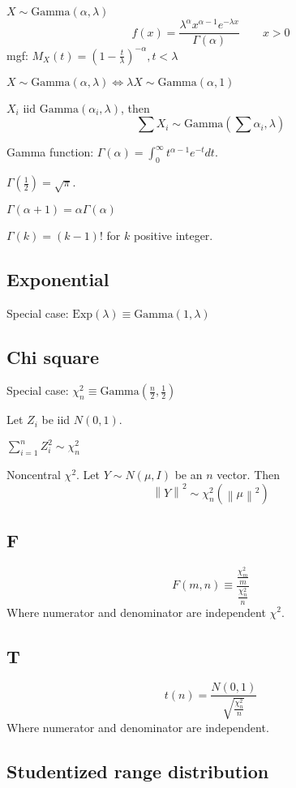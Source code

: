 \documentclass[10pt, twocolumn]{article}
\newcommand{\norm}[1]{\left\lVert#1\right\rVert}
\newcommand{\iid}{\text{ iid }}
\begin{document}
$X \sim \text{Gamma}(\alpha, \lambda)$
\[
    f(x) = \frac{\lambda^\alpha x^{\alpha-1} e^{-\lambda x}}{\Gamma(\alpha)}
    \qquad x > 0
\]
mgf: $M_X (t) = (1 - \frac{t}{\lambda})^{-\alpha}, t < \lambda$

$X \sim \text{Gamma}(\alpha, \lambda) \iff \lambda X \sim \text{Gamma}(\alpha, 1)$

$X_i \iid \text{Gamma}(\alpha_i, \lambda)$, then
\[
    \sum X_i \sim \text{Gamma}(\sum \alpha_i, \lambda)
\]

Gamma function: $\Gamma(\alpha) = \int_0^\infty t^{\alpha-1} e^{-t} dt$.

$\Gamma(\frac{1}{2}) = \sqrt{\pi}$.

$\Gamma(\alpha + 1) = \alpha \Gamma(\alpha)$

$\Gamma(k) = (k-1)!$ for $k$ positive integer.

\subsection{Exponential}

Special case: $\text{Exp}(\lambda) \equiv \text{Gamma}(1, \lambda)$

\subsection{Chi square}

Special case: $\chi^2_n \equiv \text{Gamma}(\frac{n}{2}, \frac{1}{2})$

Let $Z_i$ be iid $N(0, 1)$.

$\sum_{i=1}^n Z_i^2 \sim \chi^2_n$

Noncentral $\chi^2$. Let $Y \sim N(\mu, I)$ be an $n$ vector. Then 
\[
    \norm{Y}^2 \sim \chi^2_n(\norm{\mu}^2)
\]

\subsection{F}
\[
    F(m, n) \equiv \frac{\frac{\chi^2_m}{m}}
        {\frac{\chi^2_n}{n}}
\]
Where numerator and denominator are independent $\chi^2$.

\subsection{T}
\[
    t(n) = \frac{N(0, 1)}
    {\sqrt{\frac{\chi^2_n}{n}}}
\]
Where numerator and denominator are independent.


\subsection{Studentized range distribution}
\end{document}
